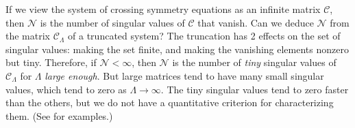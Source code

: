 \documentclass[12pt, a4paper]{article}
\begin{document}
If we view the system of crossing symmetry equations as an infinite matrix $\mathcal{C}$, then $\mathcal{N}$ is the number of singular values of $\mathcal{C}$ that vanish. Can we deduce $\mathcal{N}$ from the matrix $\mathcal{C}_\Lambda$ of a truncated system? The truncation has 2 effects on the set of singular values: making the set finite, and making the vanishing elements nonzero but tiny. Therefore, if $\mathcal{N}<\infty$, then $\mathcal{N}$ is the number of \textit{tiny} singular values of $\mathcal{C}_\Lambda$ for $\Lambda$ \textit{large enough}. But large matrices tend to have many small singular values, which tend to zero as $\Lambda\to \infty$. The tiny singular values tend to zero faster than the others, but we do not have a quantitative criterion for characterizing them. (See \cite{gjnrs23} for examples.) 
\end{document}

